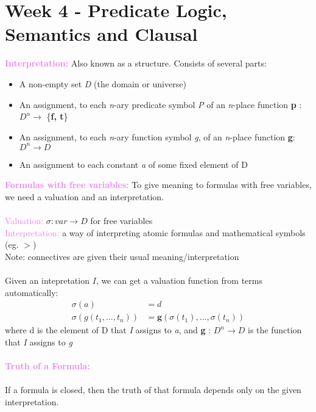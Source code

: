 \documentclass[a4paper,10pt]{article}
\begin{document}
\section*{Week 4 - Predicate Logic, Semantics and Clausal}
\noindent \textcolor{Violet}{\textbf{Interpretation:}} Also known as a structure. Consists of several parts:
\renewcommand{\labelitemi}{\textperiodcentered}
\begin{itemize}
\item A non-empty set \emph{D} (the domain or universe)
\item An assignment, to each \textit{n}-ary predicate symbol \emph{P} of an \textit{n}-place function \textbf{p} : $D^{n} \rightarrow$ \{\textbf{f, t}\}
\item An assignment, to each \textit{n}-ary function symbol \textit{g}, of an \textit{n}-place function \textbf{g}: $D^{n} \rightarrow D$ 
\item An assignment to each constant \textit{a} of some fixed element of D
\end{itemize}
\noindent \textcolor{Violet}{\textbf{Formulas with free variables:}} To give meaning to formulas with free variables, we need a valuation and an interpretation. \\ \\
\indent \textcolor{Violet}{Valuation:} $\sigma : var \rightarrow D$ for free variables \\
\indent \textcolor{Violet}{Interpretation:} a way of interpreting atomic formulas and mathematical symbols (eg. $>$) \\
\indent Note: connectives are given their usual meaning/interpretation \\ \\
\indent Given an intepretation $I$, we can get a valuation function from terms automatically: 
\begin{align*}
\sigma(a) &= d \\
\sigma(g(t_{1},...,t_{n})) &= \textbf{g}(\sigma(t_{1}),..., \sigma(t_{n})) 
\end{align*}
\indent where d is the element of D that \textit{I} assigns to \emph{a}, and \textbf{g} : $D^{n} \rightarrow D$ is the function that \textit{I} assigns to \textit{g} \\\\
\noindent \textcolor{Violet}{\textbf{Truth of a Formula:}} \\ \\
\indent If a formula is closed, then the truth of that formula depends only on the given interpretation. 
\end{document}
